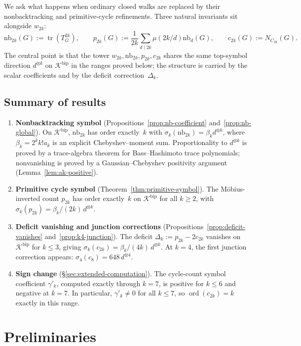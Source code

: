 \documentclass[11pt]{amsart}
\newcommand{\K}{\mathcal{K}}
\newcommand{\tr}{\operatorname{tr}}
\newcommand{\ord}{\operatorname{ord}}
\newcommand{\nb}{\mathrm{nb}}
\theoremstyle{definition}
\theoremstyle{remark}
\begin{document}
We ask what happens when ordinary closed walks are replaced by their nonbacktracking and primitive-cycle refinements. Three natural invariants sit alongside $w_{2k}$:
\[
\nb_{2k}(G):=\tr(T_G^{2k}),\qquad
p_{2k}(G):=\frac{1}{2k}\sum_{d\mid 2k}\mu(2k/d)\nb_d(G),\qquad
c_{2k}(G):=N_{C_{2k}}(G).
\]
The central point is that the tower $w_{2k},\nb_{2k},p_{2k},c_{2k}$ shares the same top-symbol direction $d^{\otimes k}$ on $\K^{\mathrm{bip}}$ in the ranges proved below; the structure is carried by the scalar coefficients and by the deficit correction~$\Delta_k$.

\subsection{Summary of results}

\begin{enumerate}[leftmargin=*]
\item \textbf{Nonbacktracking symbol} (Propositions~\ref{prop:nb-coefficient} and~\ref{prop:nb-global}). On $\K^{\mathrm{bip}}$, $\nb_{2k}$ has order exactly~$k$ with $\sigma_k(\nb_{2k})=\beta_k d^{\otimes k}$, where $\beta_k=2^k k! a_k$ is an explicit Chebyshev--moment sum. Proportionality to $d^{\otimes k}$ is proved by a trace-algebra theorem for Bass--Hashimoto trace polynomials; nonvanishing is proved by a Gaussian--Chebyshev positivity argument (Lemma~\ref{lem:ak-positive}).
\item \textbf{Primitive cycle symbol} (Theorem~\ref{thm:primitive-symbol}). The M\"obius-inverted count $p_{2k}$ has order exactly~$k$ on $\K^{\mathrm{bip}}$ for all $k\ge2$, with $\sigma_k(p_{2k})=\beta_k/(2k)\,d^{\otimes k}$.
\item \textbf{Deficit vanishing and junction corrections} (Propositions~\ref{prop:deficit-vanishes} and~\ref{prop:k4-junction}). The deficit $\Delta_k:=p_{2k}-2c_{2k}$ vanishes on $\K^{\mathrm{bip}}$ for $k\le3$, giving $\sigma_k(c_{2k})=\beta_k/(4k)\,d^{\otimes k}$. At $k=4$, the first junction correction appears: $\sigma_4(c_8)=648\,d^{\otimes4}$.
\item \textbf{Sign change} (\S\ref{sec:extended-computation}). The cycle-count symbol coefficient $\gamma'_k$, computed exactly through $k=7$, is positive for $k\le6$ and negative at $k=7$. In particular, $\gamma'_k\ne0$ for all $k\le7$, so $\ord(c_{2k})=k$ exactly in this range.
\end{enumerate}

\section{Preliminaries}
\end{document}

